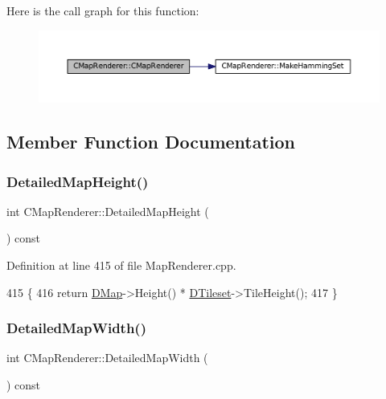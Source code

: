 Here is the call graph for this function\+:
\nopagebreak
\begin{figure}[H]
\begin{center}
\leavevmode
\includegraphics[width=350pt]{classCMapRenderer_a9aca3f780976a94fc6e8873e3cf8e199_cgraph}
\end{center}
\end{figure}


\subsection{Member Function Documentation}
\hypertarget{classCMapRenderer_a08177d52d070532e46538ec65c88277d}{}\label{classCMapRenderer_a08177d52d070532e46538ec65c88277d} 
\subsubsection{\texorpdfstring{Detailed\+Map\+Height()}{DetailedMapHeight()}}
{\footnotesize\ttfamily int C\+Map\+Renderer\+::\+Detailed\+Map\+Height (\begin{DoxyParamCaption}{ }\end{DoxyParamCaption}) const}



Definition at line 415 of file Map\+Renderer.\+cpp.


\begin{DoxyCode}
415                                          \{
416     \textcolor{keywordflow}{return} \hyperlink{classCMapRenderer_ab9a199c61aa1c87a3248af3085d8ba52}{DMap}->Height() * \hyperlink{classCMapRenderer_ace0648cba050b5e02431096edd15b836}{DTileset}->TileHeight();
417 \}
\end{DoxyCode}
\hypertarget{classCMapRenderer_a12af1a120fdfa3e80f451ba22fe21a62}{}\label{classCMapRenderer_a12af1a120fdfa3e80f451ba22fe21a62} 
\subsubsection{\texorpdfstring{Detailed\+Map\+Width()}{DetailedMapWidth()}}
{\footnotesize\ttfamily int C\+Map\+Renderer\+::\+Detailed\+Map\+Width (\begin{DoxyParamCaption}{ }\end{DoxyParamCaption}) const}



